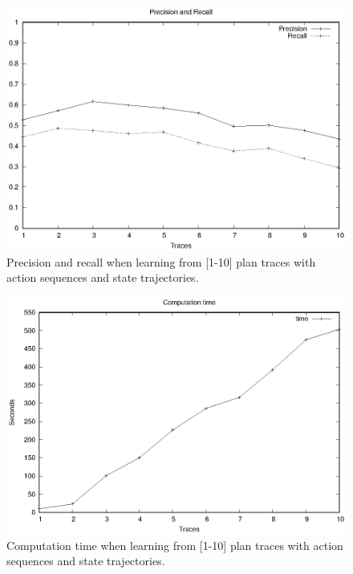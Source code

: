 \begin{figure}[hbt!]
	\centering
	\includegraphics[width=0.65\linewidth]{figures/input_size_0_0_precision.eps}
	\caption{Precision and recall when learning from [1-10] plan traces with \NO action sequences and \NO state trajectories.}
	\label{fig:pspace_quality}
\end{figure}
\begin{figure}[hbt!]
	\centering
	\includegraphics[width=0.65\linewidth]{figures/input_size_0_0_time.eps}
	\caption{Computation time when learning from [1-10] plan traces with \NO action sequences and \NO state trajectories.}
	\label{fig:pspace_time}
\end{figure}



